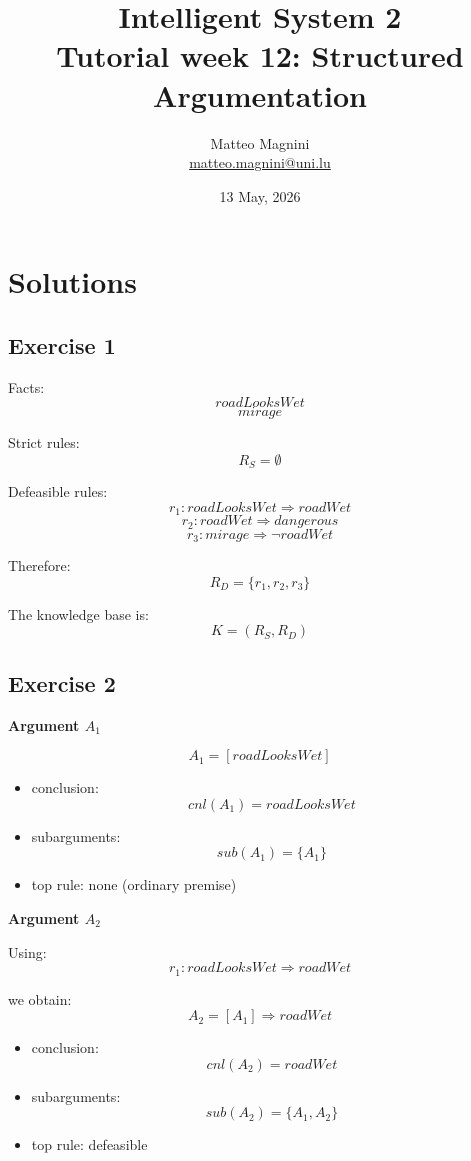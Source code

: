 \documentclass[11pt]{article}
\title{
    Intelligent System 2\\
    Tutorial week 12: Structured Argumentation
}
\author{
    Matteo Magnini\\
    \href{mailto:matteo.magnini@uni.lu}{matteo.magnini@uni.lu}
}
\date{
    13 May, 2026
}
\begin{document}
\maketitle

\section{Solutions}

\subsection{Exercise 1}

Facts:
\[
roadLooksWet
\]
\[
mirage
\]

Strict rules:
\[
R_S = \emptyset
\]

Defeasible rules:
\[
r_1: roadLooksWet \Rightarrow roadWet
\]
\[
r_2: roadWet \Rightarrow dangerous
\]
\[
r_3: mirage \Rightarrow \neg roadWet
\]

Therefore:
\[
R_D = \{r_1,r_2,r_3\}
\]

The knowledge base is:
\[
K=(R_S,R_D)
\]

\subsection{Exercise 2}

\textbf{Argument $A_1$}

\[
A_1=[roadLooksWet]
\]

\begin{itemize}
    \item conclusion:
    \[
    cnl(A_1)=roadLooksWet
    \]

    \item subarguments:
    \[
    sub(A_1)=\{A_1\}
    \]

    \item top rule:
    none (ordinary premise)
\end{itemize}

\bigskip

\textbf{Argument $A_2$}

Using:
\[
r_1: roadLooksWet \Rightarrow roadWet
\]

we obtain:
\[
A_2=[A_1]\Rightarrow roadWet
\]

\begin{itemize}
    \item conclusion:
    \[
    cnl(A_2)=roadWet
    \]

    \item subarguments:
    \[
    sub(A_2)=\{A_1,A_2\}
    \]

    \item top rule:
    defeasible
\end{itemize}
\end{document}
